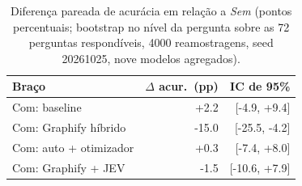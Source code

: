 \begin{table}[!htbp]\caption{Diferença pareada de acurácia em relação a \emph{Sem} (pontos percentuais; bootstrap no nível da pergunta sobre as 72 perguntas respondíveis, 4000 reamostragens, seed 20261025, nove modelos agregados).}\label{tab:paired}\centering\footnotesize
\begin{tabular}{@{}lrr@{}}\toprule Braço & $\Delta$ acur.\ (pp) & IC de 95\%\\\midrule
Com: baseline & +2.2 & [-4.9, +9.4]\\
Com: Graphify híbrido & -15.0 & [-25.5, -4.2]\\
Com: auto + otimizador & +0.3 & [-7.4, +8.0]\\
Com: Graphify + JEV & -1.5 & [-10.6, +7.9]\\
\bottomrule\end{tabular}\end{table}
